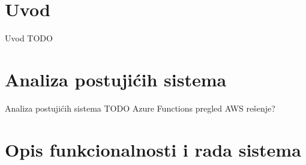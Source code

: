 \documentclass[12pt,oneside]{memoir}
\begin{document}
\frontmatter
\naslovna
\komisija
\apstrakt
\tableofcontents*

\mainmatter

\chapter{Uvod}
Uvod TODO




\chapter{Analiza postujićih sistema}
\label{chp:analizapostojucihsistema}
Analiza postujićih sistema TODO
Azure Functions pregled
AWS rešenje?

\chapter{Opis funkcionalnosti i rada sistema}
\label{chp:opisfunkc}
\end{document}
